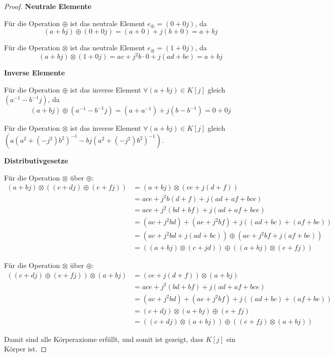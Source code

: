\documentclass{../problemset}
\begin{document}
\begin{problem}
\begin{proof}
\textbf{Neutrale Elemente}

Für die Operation $\oplus$ ist das neutrale Element $e_\oplus = (0+0j)$, da \[
	(a + bj) \oplus (0 + 0j)   = (a + 0) + j(b + 0) = a + bj
\]

Für die Operation $\otimes$ ist das neutrale Element $e_\otimes = (1+0j)$, da \[
	(a + bj) \otimes (1 + 0j)  = ac + j^2b \cdot 0 + j(ad + bc) = a + bj
\]

\textbf{Inverse Elemente}

Für die Operation $\oplus$ ist das inverse Element $\forall (a + bj) \in K[j]$ gleich $(a^{-1} - b^{-1}j)$, da \[
	(a + bj) \oplus (a^{-1} - b^{-1}j) = (a + a^{-1}) + j(b - b^{-1}) = 0 + 0j
\]

Für die Operation $\otimes$ ist das inverse Element $\forall (a + bj) \in K[j]$ gleich $(a{(a^2+(-j^2)b^2)}^{-1} - bj{(a^2+(-j^2)b^2)}^{-1})$.

\textbf{Distributivgesetze}

Für die Operation $\otimes$ über $\oplus$:
\begin{align}
	(a + bj) \otimes ((c + dj) \oplus (e + fj)) & = (a + bj) \otimes (ce + j(d + f))                               \\
	& = ace + j^2b(d + f) + j(ad + af + bce)                              \\
	& = ace + j^2(bd + bf) + j(ad + af + bce)                              \\
	& = (ac + j^2bd) + (ae + j^2bf) + j((ad + bc) + (af + be))        \\
	& = (ac + j^2bd + j(ad + bc)) \oplus (ae + j^2bf + j(af + be))     \\
	& = ((a + bj) \otimes (c + jd)) \oplus ((a + bj) \otimes (e + fj))
\end{align}

Für die Operation $\otimes$ über $\oplus$:
\begin{align}
	((c + dj) \oplus (e + fj)) \otimes (a + bj) & = (ce + j(d + f)) \otimes (a + bj)                               \\
	& = ace + j^2(bd + bf) + j(ad + af + bce)                              \\
	& = (ac + j^2bd) + (ae + j^2bf) + j((ad + bc) + (af + be))        \\
	& = (c + dj) \otimes (a + bj) \oplus (e + fj)     \\
	& = ((c + dj) \otimes (a + bj)) \oplus ((e + fj) \otimes (a + bj))
\end{align}

Damit sind alle Körperaxiome erfüllt, und somit ist gezeigt, dass $K[j]$ ein Körper ist.
\end{proof}
\end{problem}
\end{document}
